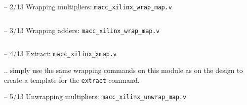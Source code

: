 \begin{frame}[t, fragile]{\subsubsecname{} -- 2/13}
Wrapping multipliers: {\tt macc\_xilinx\_wrap\_map.v}

\begin{columns}
\column[t]{5cm}

\column[t]{5cm}

\end{columns}
\end{frame}

\begin{frame}[t, fragile]{\subsubsecname{} -- 3/13}
Wrapping adders: {\tt macc\_xilinx\_wrap\_map.v}

\begin{columns}
\column[t]{5cm}

\column[t]{5cm}

\end{columns}
\end{frame}

\begin{frame}[t, fragile]{\subsubsecname{} -- 4/13}
Extract: {\tt macc\_xilinx\_xmap.v}



.. simply use the same wrapping commands on this module as on the design to create a template for the {\tt extract} command.
\end{frame}

\begin{frame}[t, fragile]{\subsubsecname{} -- 5/13}
Unwrapping multipliers: {\tt macc\_xilinx\_unwrap\_map.v}

\begin{columns}
\column[t]{5cm}

\column[t]{5cm}

\end{columns}
\end{frame}

